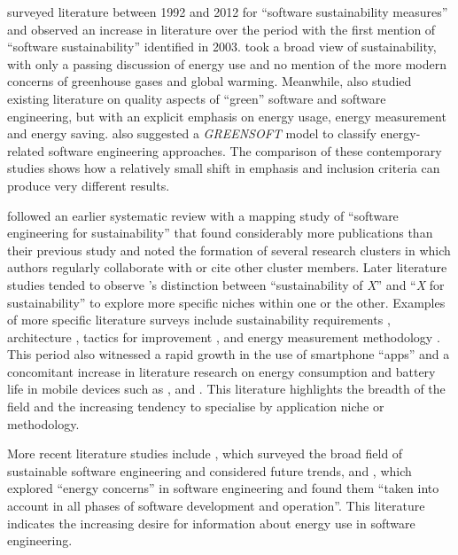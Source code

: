 \citet{Calero2013} surveyed literature between 1992 and 2012 for \enquote{software sustainability measures} and observed an increase in literature over the period with the first mention of \enquote{software sustainability} identified in 2003. \citeauthor{Calero2013} took a broad view of sustainability, with only a passing discussion of energy use and no mention of the more modern concerns of greenhouse gases and global warming. Meanwhile, \citet{Kern2013} also studied existing literature on quality aspects of \enquote{green} software and software engineering, but with an explicit emphasis on energy usage, energy measurement and energy saving. \citeauthor{Kern2013} also suggested a \emph{GREENSOFT} model to classify energy-related software engineering approaches. The comparison of these contemporary studies shows how a relatively small shift in emphasis and inclusion criteria can produce very different results.

\citet{Penzenstadler2014a} followed an earlier systematic review \citep{Penzenstadler2012} with a mapping study of \enquote{software engineering for sustainability} that found considerably more publications than their previous study and noted the formation of several research clusters in which authors regularly collaborate with or cite other cluster members. Later literature studies tended to observe \citet{Penzenstadler2013}'s distinction between \enquote{sustainability of \emph{X}} and \enquote{\emph{X} for sustainability} to explore more specific niches within one or the other. Examples of more specific literature surveys include sustainability requirements \citep{Chitchyan2016}, architecture \citep{Paradis2021}, tactics for improvement \citep{Balanza-Martinez2023}, and energy measurement methodology \citep{Hindle2016}. This period also witnessed a rapid growth in the use of smartphone \enquote{apps} and a concomitant increase in literature research on energy consumption and battery life in mobile devices such as \citet{Ahmad2015}, \citet{Moreira2020} and \citet{Schuler2023}. This literature highlights the breadth of the field and the increasing tendency to specialise by application niche or methodology.

More recent literature studies include \citet{Venters2023}, which surveyed the broad field of sustainable software engineering and considered future trends, and \citet{Lee2024}, which explored \enquote{energy concerns} in software engineering and found them \enquote{taken into account in all phases of software development and operation}. This literature indicates the increasing desire for information about energy use in software engineering.

